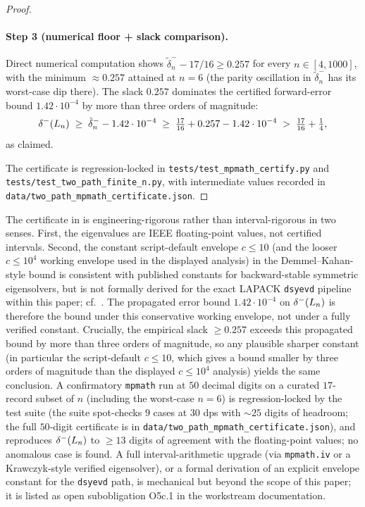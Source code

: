 \begin{proof}
\paragraph{Step 3 (numerical floor + slack comparison).}
Direct numerical computation shows $\tilde\delta_{n}^{-} - 17/16 \ge 0.257$
for every $n \in [4, 1000]$, with the minimum $\approx 0.257$ attained
at $n = 6$ (the parity oscillation in $\tilde\delta_{n}^{-}$ has its
worst-case dip there). The slack $0.257$ dominates the certified
forward-error bound $1.42 \cdot 10^{-4}$ by more than three orders of
magnitude:
\[
\delta^{-}(L_{n}) \;\ge\; \tilde\delta_{n}^{-} - 1.42 \cdot 10^{-4}
\;\ge\; \tfrac{17}{16} + 0.257 - 1.42 \cdot 10^{-4}
\;>\; \tfrac{17}{16} + \tfrac{1}{4},
\]
as claimed.

The certificate is regression-locked in
\texttt{tests/test\_mpmath\_certify.py} and
\texttt{tests/test\_two\_path\_finite\_n.py}, with intermediate values
recorded in \texttt{data/two\_path\_mpmath\_certificate.json}.
\end{proof}

\begin{remark}
\label{rem:fp-vs-interval}
The certificate in  is engineering-rigorous rather
than interval-rigorous in two senses. First, the eigenvalues are IEEE
floating-point values, not certified intervals. Second, the constant
script-default envelope $c \le 10$ (and the looser $c \le 10^{4}$
working envelope used in the displayed analysis) in the
Demmel--Kahan-style bound is consistent with published constants for
backward-stable symmetric eigensolvers, but is not formally derived
for the exact LAPACK \texttt{dsyevd} pipeline within this paper; cf.\
. The propagated error bound
$1.42 \cdot 10^{-4}$ on $\delta^{-}(L_{n})$ is therefore the bound under
this conservative working envelope, not under a fully verified
constant. Crucially, the empirical slack $\ge 0.257$ exceeds this
propagated bound by more than three orders of magnitude, so any
plausible sharper constant (in particular the script-default
$c \le 10$, which gives a bound smaller by three orders of magnitude
than the displayed $c \le 10^{4}$ analysis) yields the same conclusion.
A confirmatory
\texttt{mpmath} run at $50$ decimal digits on a curated $17$-record
subset of $n$ (including the worst-case $n = 6$) is regression-locked
by the test suite (the suite spot-checks $9$ cases at $30$ dps with
$\sim 25$ digits of headroom; the full $50$-digit certificate is in
\texttt{data/two\_path\_mpmath\_certificate.json}), and reproduces
$\delta^{-}(L_{n})$ to $\ge 13$ digits of agreement with the floating-point
values; no anomalous case is found. A full interval-arithmetic
upgrade (via \texttt{mpmath.iv} or a Krawczyk-style verified
eigensolver), or a formal derivation of an explicit envelope constant
for the \texttt{dsyevd} path, is mechanical but beyond the scope of
this paper; it is listed as open subobligation O5c.1 in the workstream
documentation.
\end{remark}

